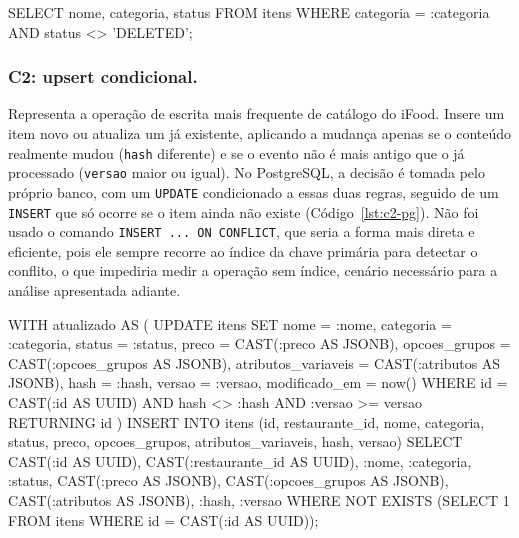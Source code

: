 \begin{codigo}[language=SQL, breaklines=true, caption={C1 no PostgreSQL.}, label={lst:c1-pg}]
SELECT nome, categoria, status
FROM itens
WHERE categoria = :categoria AND status <> 'DELETED';
\end{codigo}


\subsubsection{C2: upsert condicional.} Representa a operação de escrita mais frequente de 
catálogo do iFood. Insere um item novo ou atualiza um já existente, aplicando a mudança 
apenas se o conteúdo realmente mudou (\texttt{hash} diferente) e se o evento não é mais 
antigo que o já processado (\texttt{versao} maior ou igual). No PostgreSQL, a decisão é tomada 
pelo próprio banco, com
um \texttt{UPDATE} condicionado a essas duas regras, seguido de um \texttt{INSERT} que só 
ocorre se o item ainda não existe (Código~\ref{lst:c2-pg}). 
Não foi usado o comando \texttt{INSERT ... ON CONFLICT}, que seria a forma mais direta e eficiente, 
pois ele sempre recorre ao índice da chave 
primária para detectar o conflito, o que impediria medir a operação sem índice, cenário 
necessário para a análise apresentada adiante.

\begin{codigo}[language=SQL, breaklines=true, caption={C2 no PostgreSQL.}, label={lst:c2-pg}]
WITH atualizado AS (
  UPDATE itens
  SET nome = :nome, categoria = :categoria, status = :status,
      preco = CAST(:preco AS JSONB),
      opcoes_grupos = CAST(:opcoes_grupos AS JSONB),
      atributos_variaveis = CAST(:atributos AS JSONB),
      hash = :hash, versao = :versao, modificado_em = now()
  WHERE id = CAST(:id AS UUID) AND hash <> :hash AND :versao >= versao
  RETURNING id
)
INSERT INTO itens (id, restaurante_id, nome, categoria, status, preco, opcoes_grupos, atributos_variaveis, hash, versao)
SELECT CAST(:id AS UUID), CAST(:restaurante_id AS UUID), :nome, :categoria, :status, CAST(:preco AS JSONB), CAST(:opcoes_grupos AS JSONB), CAST(:atributos AS JSONB), :hash, :versao
WHERE NOT EXISTS (SELECT 1 FROM itens WHERE id = CAST(:id AS UUID));
\end{codigo}

